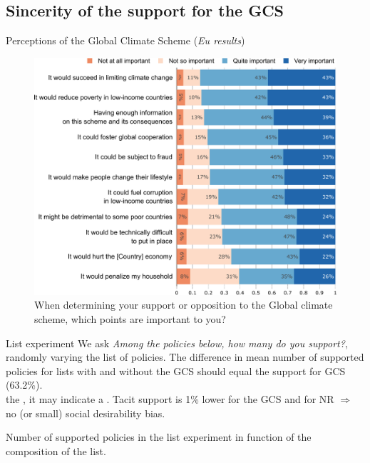 \begin{framefont}{\small}
\section{Sincerity of the support for the GCS}

\begin{frame}{Perceptions of the Global Climate Scheme (\textit{Eu results})\label{}}
	\vspace{-.3cm}
    \begin{figure}
        \centering 
        \caption{When determining your support or opposition to the Global climate scheme, which points are important to you?}
        \vspace{-.2cm}
        \includegraphics[height=.9\textheight]{../figures/EU/gcs_important.pdf} 
    \end{figure}
\end{frame}

\begin{frame}{List experiment\label{}}
\bbvs \ip We ask \textit{Among the policies below, how many do you support?}, randomly varying the list of policies.
\ip The difference in mean number of supported policies for lists with and without the GCS should equal the support for GCS (63.2\%). \\  the  , it may indicate a .
\ip Tacit support is 1\% lower for the GCS and for NR $\Rightarrow$ no (or small) social desirability bias. %
\ee
    \begin{table}[h]\label{tab:list_exp}
        \caption{Number of supported policies in the list experiment in function of the composition of the list. } %
        \makebox[\textwidth][c]{}
      \end{table}
\end{frame}



\end{framefont}

